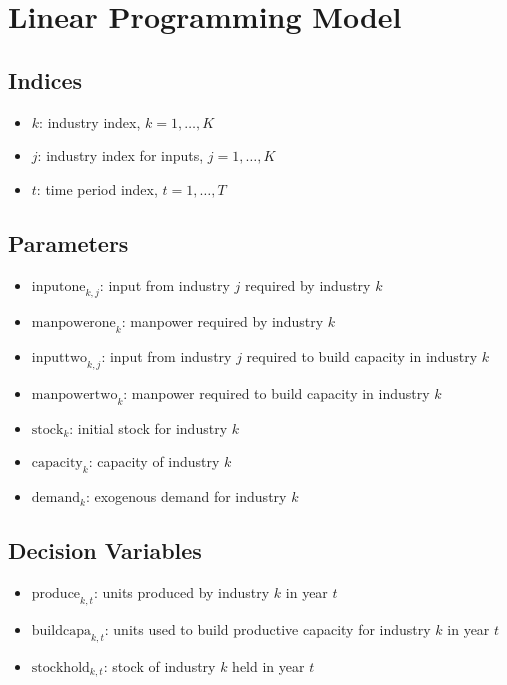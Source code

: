 \documentclass{article}
\begin{document}
\section*{Linear Programming Model}

\subsection*{Indices}
\begin{itemize}
    \item \( k \): industry index, \( k = 1, \ldots, K \)
    \item \( j \): industry index for inputs, \( j = 1, \ldots, K \)
    \item \( t \): time period index, \( t = 1, \ldots, T \)
\end{itemize}

\subsection*{Parameters}
\begin{itemize}
    \item \( \text{inputone}_{k,j} \): input from industry \( j \) required by industry \( k \)
    \item \( \text{manpowerone}_{k} \): manpower required by industry \( k \)
    \item \( \text{inputtwo}_{k,j} \): input from industry \( j \) required to build capacity in industry \( k \)
    \item \( \text{manpowertwo}_{k} \): manpower required to build capacity in industry \( k \)
    \item \( \text{stock}_{k} \): initial stock for industry \( k \)
    \item \( \text{capacity}_{k} \): capacity of industry \( k \)
    \item \( \text{demand}_{k} \): exogenous demand for industry \( k \)
\end{itemize}

\subsection*{Decision Variables}
\begin{itemize}
    \item \( \text{produce}_{k,t} \): units produced by industry \( k \) in year \( t \)
    \item \( \text{buildcapa}_{k,t} \): units used to build productive capacity for industry \( k \) in year \( t \)
    \item \( \text{stockhold}_{k,t} \): stock of industry \( k \) held in year \( t \)
\end{itemize}
\end{document}
